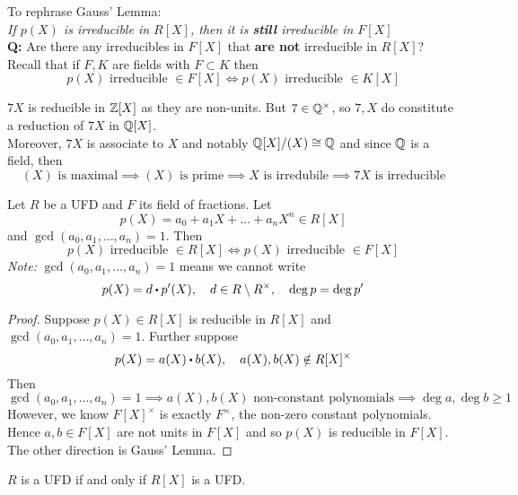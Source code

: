\documentclass[../Main.tex]{subfiles}
\begin{document}
To rephrase Gauss' Lemma:\\ \textit{If $p(X)$ is irreducible in $R[X]$, then it is \textbf{still} irreducible in $F[X]$}\\
\textbf{Q:} Are there any irreducibles in $F[X]$ that \textbf{are not} irreducible in $R[X]$?\\
Recall that if $F,K$ are fields with $F\subset K$ then \[p(X) \text{ irreducible }\in F[X] \Longleftrightarrow p(X) \text{ irreducible }\in K[X]\]
\begin{example}
	$7X$ is reducible in $\mathbb{Z}[X]$ as they are non-units. But $7\in \mathbb{Q}^\times$, so $7,X$ do constitute a reduction of $7X$ in $\mathbb{Q}[X]$.\\
	Moreover, $7X$ is associate to $X$ and notably $\mathbb{Q}[X]/(X)\cong \mathbb{Q}$ and since $\mathbb{Q}$ is a field, then
	\[ (X) \text{ is maximal}\implies (X) \text{ is prime}\implies X\text{ is irredubile}\implies 7X\text{ is irreducible}\]
\end{example}
\begin{crl}[label=13.2]
	Let $R$ be a UFD and $F$ its field of fractions. Let
	\[p(X)=a_0+a_1X+\dots+a_nX^n \in R[X]\]
	and $\gcd(a_0,a_1,\dots,a_n)=1$. Then
	\[p(X) \text{ irreducible }\in R[X] \Longleftrightarrow p(X) \text{ irreducible }\in F[X]\]
	\textit{Note:} $\gcd(a_0,a_1,\dots,a_n)=1$ means we cannot write
	\[p(X)=d\rdot p'(X),\quad d\in R\setminus R^\times, \quad \deg p =\deg p'\] 
\end{crl}
\begin{proof}
	Suppose $p(X)\in R[X]$ is reducible in $R[X]$ and $\gcd(a_0,a_1,\dots,a_n)=1$. Further suppose 
	\[p(X)=a(X)\rdot b(X),\quad a(X), b(X) \notin R[X]^\times \]
	Then
	\[\gcd(a_0,a_1,\dots,a_n)=1 \implies a(X), b(X) \text{ non-constant polynomials}\implies \deg a, \deg b\ge 1\]
	However, we know $F[X]^\times$ is exactly $F^\times$, the non-zero constant polynomials. Hence $a,b\in F[X]$ are not units in $F[X]$ and so $p(X)$ is reducible in $F[X]$.
	The other direction is Gauss' Lemma.
\end{proof}
\begin{thm}[title = \texorpdfstring{$R$ UFD $\Longleftrightarrow R[X]$ UFD}{R UFD iff R[X] UFD}]
	$R$ is a UFD if and only if $R[X]$ is a UFD.
\end{thm}
\end{document}
